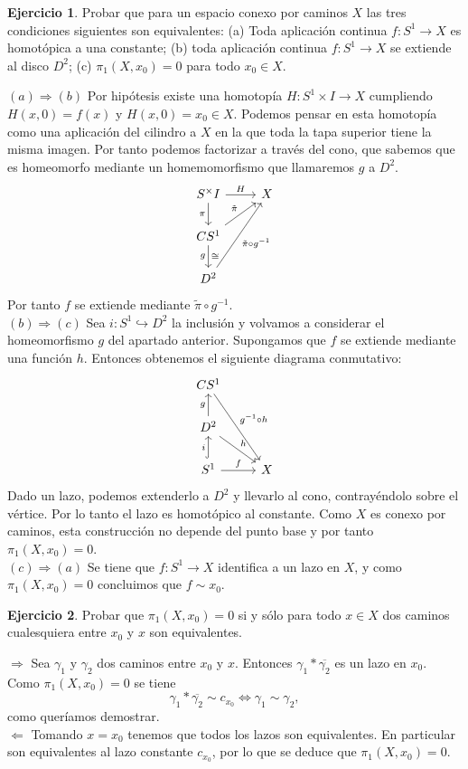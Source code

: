 \documentclass[12pt,a4paper]{amsart}
\theoremstyle{definition}               %
\newtheorem{nothing}{Ejercicio}
\theoremstyle{plain}
\newenvironment{solucion}{\begin{trivlist}
	\item[\hskip \labelsep {\textit{Solución}.}\hskip \labelsep]}{\end{trivlist}}
\begin{document}
\begin{nothing} Probar que para un espacio conexo por caminos $X$ las tres condiciones siguientes son equivalentes:
(a) Toda aplicaci\'on continua $f: S^1\to X$ es homot\'opica a una constante; (b) toda aplicaci\'on continua $f: S ^1 \to X$ se extiende al disco $D^2$;
(c) $\pi_1(X,x_0) = 0$ para todo $x_0\in X$.
\end{nothing}
\begin{solucion}
$\boxed{(a)\Rightarrow(b)}$ Por hipótesis existe una homotopía $H:S^1\times I\to X$ cumpliendo $H(x,0)=f(x)$ y $H(x,0)=x_0\in X$. Podemos pensar en esta homotopía como una aplicación del cilindro a $X$ en la que toda la tapa superior tiene la misma imagen. Por tanto podemos factorizar a través del cono, que sabemos que es homeomorfo mediante un homemomorfismo que llamaremos $g$ a $D^2$.
\[
\begin{tikzcd}
S^\times I\arrow[r,"H"]\arrow[d,"\pi"']& X\\
CS^1\arrow[ur,"\tilde{\pi}"]\arrow[d,"g"',"\cong"]\\
D^2\arrow[uur,"\tilde{\pi}\circ g^{-1}"']
\end{tikzcd}
\]
Por tanto $f$ se extiende mediante $\tilde{\pi}\circ g^{-1}$.\\
$\boxed{(b)\Rightarrow(c)}$ Sea $i:S^1\hookrightarrow D^2$ la inclusión y volvamos a considerar el homeomorfismo $g$ del apartado anterior. Supongamos que $f$ se extiende mediante una función $h$. Entonces obtenemos el siguiente diagrama conmutativo:
\[
\begin{tikzcd}
CS^1\arrow[ddr,"g^{-1}\circ h"]\\
D^2\arrow[u,"g"]\arrow[dr,"h"]\\
S^1\arrow[u,"i",hookrightarrow]\arrow[r,"f"]& X
\end{tikzcd}
\]
Dado un lazo, podemos extenderlo a $D^2$ y llevarlo al cono, contrayéndolo sobre el vértice. Por lo tanto el lazo es homotópico al constante. Como $X$ es conexo por caminos, esta construcción no depende del punto base y por tanto $\pi_1(X,x_0)=0$.\\
$\boxed{(c)\Rightarrow(a)}$ Se tiene que $f:S^1\to X$ identifica a un lazo en $X$, y como $\pi_1(X,x_0)=0$ concluimos que $f\sim x_0$.
\end{solucion}

\vspace{0.1cm}

\begin{nothing}
Probar que $\pi_1(X,x_0) = 0$ si y s\'olo para todo $x\in X$ dos caminos cualesquiera entre $x_0$ y $x$ son equivalentes.
\end{nothing}
\begin{solucion}
$\boxed{\Rightarrow}$ Sea $\gamma_1$ y $\gamma_2$ dos caminos entre $x_0$ y $x$. Entonces $\gamma_1*\overline{\gamma_2}$ es un lazo en $x_0$. Como $\pi_1(X,x_0)=0$ se tiene
\[
\gamma_1*\overline{\gamma_2}\sim c_{x_0}\Leftrightarrow \gamma_1\sim\gamma_2,
\]
como queríamos demostrar.\\
$\boxed{\Leftarrow}$ Tomando $x=x_0$ tenemos que todos los lazos son equivalentes. En particular son equivalentes al lazo constante $c_{x_0}$, por lo que se deduce que $\pi_1(X,x_0)=0$.
\end{solucion}
\end{document}
